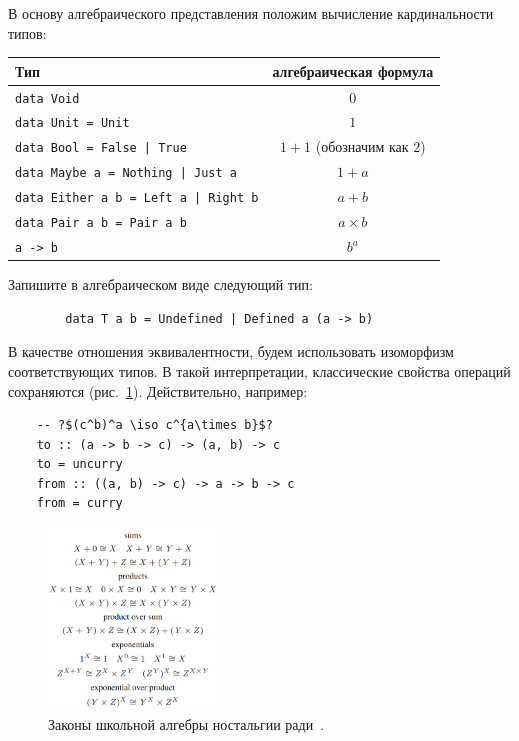 В основу алгебраического представления положим вычисление кардинальности типов:
\begin{center}
    \begin{tabular}{|p{}|c|}
        \hline
        Тип                                                      & алгебраическая формула      \\
        \hline
        \texttt{data Void}                          & $0$                         \\
        \texttt{data Unit = Unit}                   & $1$                         \\
        \texttt{data Bool = False | True}           & $1 + 1$ (обозначим как $2$) \\
        \texttt{data Maybe a = Nothing | Just a}    & $1 + a$                     \\
        \texttt{data Either a b = Left a | Right b} & $a + b$                     \\
        \texttt{data Pair a b = Pair a b}           & $a \times b$                \\
        \texttt{a -> b}                             & $b^a$                       \\
        \hline
    \end{tabular}
\end{center}

\begin{task}
    Запишите в алгебраическом виде следующий тип:
    \begin{verbatim}
        data T a b = Undefined | Defined a (a -> b)
    \end{verbatim}
\end{task}

В качестве отношения эквивалентности, будем использовать изоморфизм соответствующих типов.
В такой интерпретации, классические свойства операций сохраняются (рис.~\ref{fig:school-alg}).
Действительно, например:
\begin{verbatim}
    -- ?$(c^b)^a \iso c^{a\times b}$?
    to :: (a -> b -> c) -> (a, b) -> c
    to = uncurry
    from :: ((a, b) -> c) -> a -> b -> c
    from = curry
\end{verbatim}

\begin{figure}
    \centering
    \includegraphics[width=0.4\textwidth]{figs/school-alg}
    \caption{Законы школьной алгебры ностальгии ради~\cite{hinze2010reason}.}
    \label{fig:school-alg}
\end{figure}

